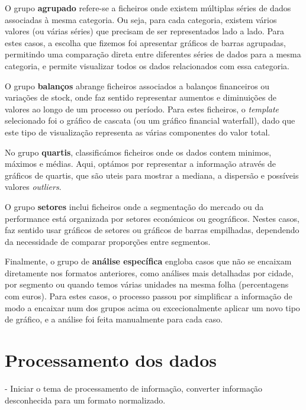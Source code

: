 O grupo \textbf{agrupado} refere-se a ficheiros onde existem múltiplas séries de dados associadas à mesma categoria. Ou seja, para cada categoria, existem vários valores (ou várias séries) que precisam de ser representados lado a lado. Para estes casos, a escolha que fizemos foi apresentar gráficos de barras agrupadas, permitindo uma comparação direta entre diferentes séries de dados para a mesma categoria, e permite visualizar todos os dados relacionados com essa categoria.

O grupo \textbf{balanços} abrange ficheiros associados a balanços financeiros ou variações de stock, onde faz sentido representar aumentos e diminuições de valores ao longo de um processo ou período. Para estes ficheiros, o \textit{template} selecionado foi o gráfico de cascata (ou um gráfico financial waterfall), dado que este tipo de visualização representa as várias componentes do valor total.

No grupo \textbf{quartis}, classificámos ficheiros onde os dados contem minimos, máximos e médias. Aqui, optámos por representar a informação através de gráficos de quartis, que são uteis para mostrar a mediana, a dispersão e possíveis valores \textit{outliers}.

O grupo \textbf{setores} inclui ficheiros onde a segmentação do mercado ou da performance está organizada por setores económicos ou geográficos. Nestes casos, faz sentido usar gráficos de setores ou gráficos de barras empilhadas, dependendo da necessidade de comparar proporções entre segmentos.

Finalmente, o grupo de \textbf{análise específica} engloba casos que não se encaixam diretamente nos formatos anteriores, como análises mais detalhadas por cidade, por segmento ou quando temos várias unidades na mesma folha (percentagens com euros). Para estes casos, o processo passou por simplificar a informação de modo a encaixar num dos grupos acima ou excecionalmente aplicar um novo tipo de gráfico, e a análise foi feita manualmente para cada caso.

\section{Processamento dos dados}
- Iniciar o tema de processamento de informação, converter informação desconhecida para um formato normalizado.


